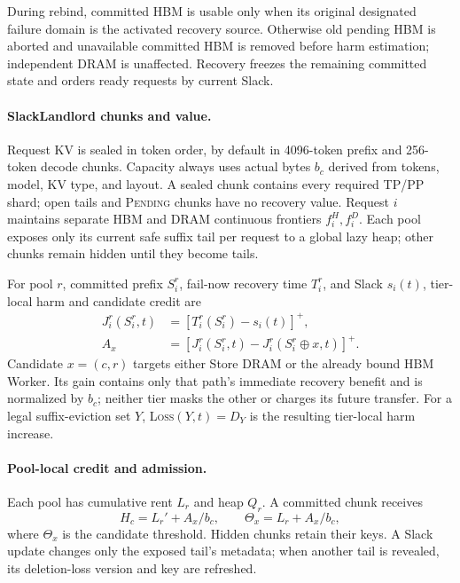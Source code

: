 During rebind, committed HBM is usable only when its original designated
failure domain is the activated recovery source.  Otherwise old pending HBM is
aborted and unavailable committed HBM is removed before harm estimation;
independent DRAM is unaffected.  Recovery freezes the remaining committed
state and orders ready requests by current Slack.

\paragraph{SlackLandlord chunks and value.}
Request KV is sealed in token order, by default in 4096-token prefix and
256-token decode chunks.  Capacity always uses actual bytes $b_c$ derived from
tokens, model, KV type, and layout.  A sealed chunk contains every required
TP/PP shard; open tails and \textsc{Pending} chunks have no recovery value.
Request $i$ maintains separate HBM and DRAM continuous frontiers
$f_i^H,f_i^D$.  Each pool exposes only its current safe suffix tail per request
to a global lazy heap; other chunks remain hidden until they become tails.

For pool $r$, committed prefix $S_i^r$, fail-now recovery time $T_i^r$, and
Slack $s_i(t)$, tier-local harm and candidate credit are
\begin{align}
 J_i^r(S_i^r,t)&=[T_i^r(S_i^r)-s_i(t)]^+, \label{eq:recovery-harm}\\
 A_x&=[J_i^r(S_i^r,t)-J_i^r(S_i^r\mathbin{\oplus}x,t)]^+ .
 \label{eq:chunk-credit}
\end{align}
Candidate $x=(c,r)$ targets either Store DRAM or the already bound HBM Worker.
Its gain contains only that path's immediate recovery benefit and is normalized
by $b_c$; neither tier masks the other or charges its future transfer.  For a
legal suffix-eviction set $Y$, \textsc{Loss}$(Y,t)=D_Y$ is the resulting
tier-local harm increase.

\paragraph{Pool-local credit and admission.}
Each pool has cumulative rent $L_r$ and heap $Q_r$.  A committed chunk receives
\begin{equation}
 H_c=L_r'+A_x/b_c,\qquad \Theta_x=L_r+A_x/b_c,
 \label{eq:landlord-credit}
\end{equation}
where $\Theta_x$ is the candidate threshold.  Hidden chunks retain their keys.
A Slack update changes only the exposed tail's metadata; when another tail is
revealed, its deletion-loss version and key are refreshed.

